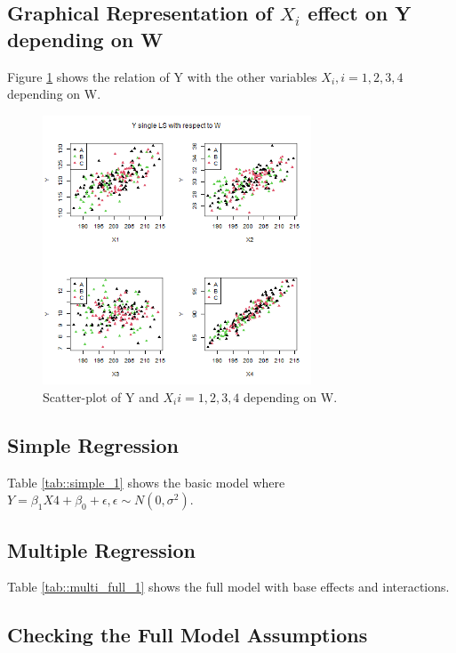 \documentclass[12pt, a4paper]{article}
\begin{document}
	
	\subsection{Graphical Representation of $X_i$ effect on Y depending on W}
	
	Figure \ref{fig::scatterplot_1} shows the relation of Y with the other variables $X_i, i=1,2,3,4$ depending on W.
	
	\begin{figure}
		\includegraphics[width=8cm]{scatterplot_1.png}
		\centering
		\caption{Scatter-plot of Y and $X_i i=1,2,3,4$ depending on W.}
		\label{fig::scatterplot_1}
	\end{figure}
	
	
	\subsection{Simple Regression}
	
	Table \ref{tab::simple_1} shows the basic model where $Y = \beta_1 X4 + \beta_0 + \epsilon, \epsilon \sim N(0, \sigma^2)$.
	
	
	
	
	\subsection{Multiple Regression}
	
	Table \ref{tab::multi_full_1} shows the full model  with base effects and interactions.
	
	
	
	
	\subsection{Checking the Full Model Assumptions}
	
\end{document}
